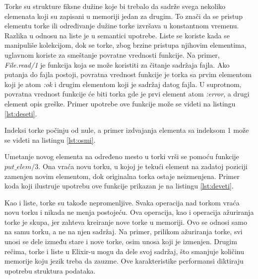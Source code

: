 \documentclass[12pt,oneside]{memoir}
\begin{document}


Torke su strukture fiksne dužine koje bi trebalo da sadrže svega nekoliko elemenata koji su zapisani u memoriji jedan za drugim. To znači da se pristup elementu torke ili određivanje dužine torke izvršava u konstantnom vremenu. Razlika u odnosu na liste je u semantici upotrebe. Liste se koriste kada se manipuliše kolekcijom, dok se torke, zbog brzine pristupa njihovim elementima, uglavnom koriste za smeštanje povratne vrednosti funkcije. Na primer, \textit{File.read/1} je funkcija koja se može koristiti za čitanje sadržaja fajla. Ako putanja do fajla postoji, povratna vrednost funkcije je torka sa prvim elementom koji je atom \textit{:ok} i drugim elementom koji je sadržaj datog fajla. U suprotnom, povratna vrednost funkcije će biti torka gde je prvi element atom \textit{:error}, a drugi element opis greške. Primer upotrebe ove funkcije može se videti na listingu \ref{lst:deseti}.



Indeksi torke počinju od nule, a primer izdvajanja elementa sa indeksom 1 može se videti na listingu \ref{lst:osmi}.



Umetanje novog elementa na određeno mesto u torki vrši se pomoću funkcije $put\_elem/3$. Ona vraća novu torku, u kojoj je tekući element na zadatoj poziciji zamenjen novim elementom, dok originalna torka ostaje neizmenjena. Primer koda koji ilustruje upotrebu ove funkcije prikazan je na listingu \ref{lst:deveti}.



Kao i liste, torke su takođe nepromenljive. Svaka operacija nad torkom vraća novu torku i nikada ne menja postojeću. Ova operacija, kao i operacija ažuriranja torke je skupa, jer zahteva kreiranje nove torke u memoriji. Ovo se odnosi samo na samu torku, a ne na njen sadržaj. Na primer, prilikom ažuriranja torke, svi unosi se dele između stare i nove torke, osim unosa koji je izmenjen. Drugim rečima, torke i liste u Elixir-u mogu da dele svoj sadržaj, što smanjuje količinu memorije koju jezik treba da zauzme. Ove karakteristike performansi diktiraju upotrebu struktura podataka. 
\end{document}
